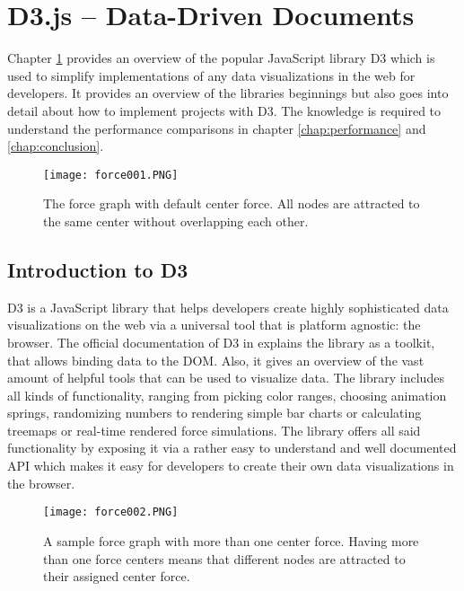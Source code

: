 \chapter{D3.js – Data-Driven Documents}
\label{cha:d3js}

Chapter \ref{cha:d3js} provides an overview of the popular JavaScript library D3 which is used to simplify implementations of any data visualizations in the web for developers. It provides an overview of the libraries beginnings but also goes into detail about how to implement projects with D3. The knowledge is required to understand the performance comparisons in chapter \ref{chap:performance} and \ref{chap:conclusion}.

\begin{figure}
    \centering
    \texttt{[image: force001.PNG]}
    \caption{The force graph with default center force. All nodes are attracted to the same center without overlapping each other.}
    \label{fig:force001}
  \end{figure}

\section{Introduction to D3}

D3 is a JavaScript library that helps developers create highly sophisticated data visualizations on the web via a universal tool that is platform agnostic: the browser. The official documentation of D3 in \cite[Introduction]{D3Website} explains the library as a toolkit, that allows binding data to the DOM. Also, it gives an overview of the vast amount of helpful tools that can be used to visualize data. The library includes all kinds of functionality, ranging from picking color ranges, choosing animation springs, randomizing numbers to rendering simple bar charts or calculating treemaps or real-time rendered force simulations. The library offers all said functionality by exposing it via a rather easy to understand and well documented API which makes it easy for developers to create their own data visualizations in the browser.

\begin{figure}
  \centering
  \texttt{[image: force002.PNG]}
  \caption{A sample force graph with more than one center force. Having more than one force centers means that different nodes are attracted to their assigned center force.}
  \label{fig:force002}
\end{figure}

